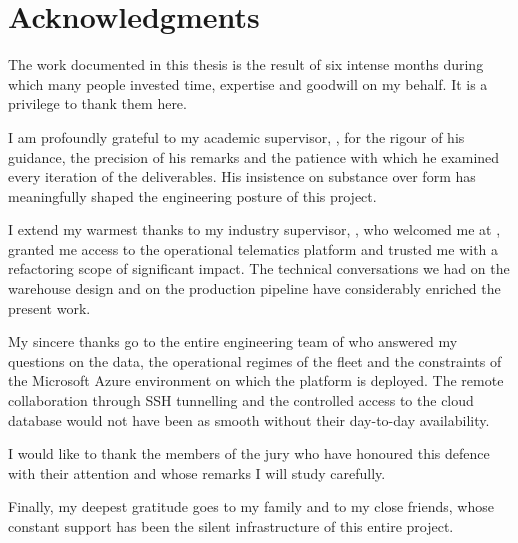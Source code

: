 \chapter*{Acknowledgments}
\thispagestyle{plain}

The work documented in this thesis is the result of six intense months during which many people invested time, expertise and goodwill on my behalf. It is a privilege to thank them here.

I am profoundly grateful to my academic supervisor, \supervisor, for the rigour of his guidance, the precision of his remarks and the patience with which he examined every iteration of the deliverables. His insistence on substance over form has meaningfully shaped the engineering posture of this project.

I extend my warmest thanks to my industry supervisor, \industrysupervisor, who welcomed me at \hostorg, granted me access to the operational telematics platform and trusted me with a refactoring scope of significant impact. The technical conversations we had on the warehouse design and on the production pipeline have considerably enriched the present work.

My sincere thanks go to the entire engineering team of \hostorg{} who answered my questions on the data, the operational regimes of the fleet and the constraints of the Microsoft Azure environment on which the platform is deployed. The remote collaboration through SSH tunnelling and the controlled access to the cloud database would not have been as smooth without their day-to-day availability.

I would like to thank the members of the jury who have honoured this defence with their attention and whose remarks I will study carefully.

Finally, my deepest gratitude goes to my family and to my close friends, whose constant support has been the silent infrastructure of this entire project.

\cleardoublepage

